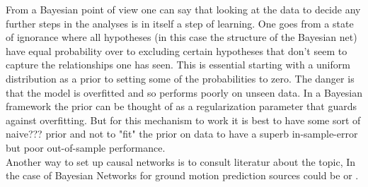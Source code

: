 From a Bayesian point of view one can say that looking at the data to decide any further steps in the analyses is in itself a step of learning. One goes from a state of ignorance where all hypotheses (in this case the structure of the Bayesian net) have equal probability over to excluding certain hypotheses that don't seem to capture the relationships one has seen. This is essential starting with a uniform distribution as a prior to setting some of the probabilities to zero. The danger is that the model is overfitted and so performs poorly on unseen data. In a Bayesian framework the prior can be thought of as a regularization parameter that guards against overfitting. But for this mechanism to work it is best to have some sort of naive??? prior and not to "fit" the prior on data to have a superb in-sample-error but poor out-of-sample performance.\\
Another way to set up causal networks is to consult literatur about the topic, In the case of Bayesian Networks for ground motion prediction sources could be \citep{kuehn2010} or \citep{Vogel2014}.\\

